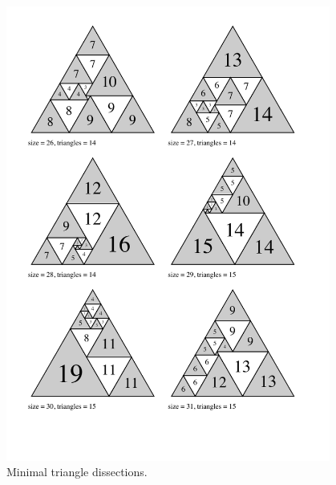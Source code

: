 \begin{figure}[htb]
\centering
\includegraphics[trim=2em 4em 3em 2em, width=0.95\textwidth]{img/tranquility5.pdf}
\caption{Minimal triangle dissections.}
\end{figure}

